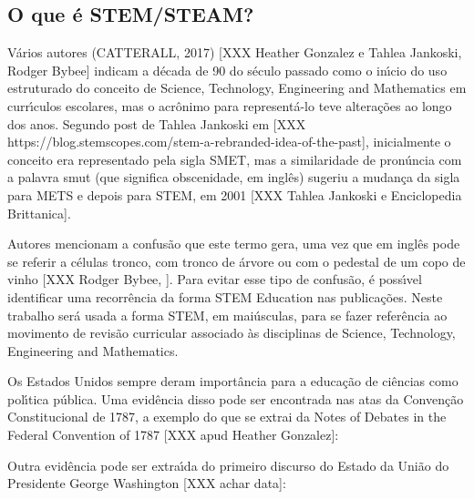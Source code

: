 \documentclass[
12pt,		%
openright,	%
twoside,  %
a4paper,			%
chapter=TITLE,		%
english,			%
french,				%
spanish,			%
brazil				%
]{USPSC-classe/USPSC}
\begin{document}
\subsection[O que \'e STEM/STEAM?]{O que \'e STEM/STEAM?}\label{O que \'e STEM/STEAM?}
V\'arios autores  (CATTERALL, 2017)  [XXX Heather Gonzalez e  Tahlea Jankoski, Rodger Bybee] indicam a d\'ecada de 90 do s\'eculo passado como o in\'{\i}cio do uso estruturado do conceito de Science, Technology, Engineering and Mathematics em curr\'{\i}culos escolares, mas o acr\^onimo para represent\'a-lo teve altera\c{c}\~oes ao longo dos anos. Segundo post de Tahlea Jankoski em [XXX https://blog.stemscopes.com/stem-a-rebranded-idea-of-the-past], inicialmente o conceito era representado pela sigla SMET, mas a similaridade de pron\'uncia com a palavra \textquotedbl smut (que significa obscenidade, em ingl\^es) sugeriu a mudan\c{c}a da sigla para METS e depois para STEM, em 2001 [XXX Tahlea Jankoski e Enciclopedia Brittanica].




Autores mencionam a confus\~ao que este termo gera, uma vez que em ingl\^es pode se referir a c\'elulas tronco, com tronco de \'arvore ou com o pedestal de um copo de vinho [XXX Rodger Bybee, ]. Para evitar esse tipo de confus\~ao, \'e poss\'{\i}vel identificar uma recorr\^encia da forma \textquotedbl STEM Education nas publica\c{c}\~oes. Neste trabalho ser\'a usada a forma STEM, em mai\'usculas, para se fazer refer\^encia ao movimento de revis\~ao curricular associado \`as disciplinas de \textquotedbl Science, Technology, Engineering and Mathematics.  




Os Estados Unidos sempre deram import\^ancia para a educa\c{c}\~ao de ci\^encias como pol\'{\i}tica p\'ublica. Uma evid\^encia disso pode ser encontrada nas atas da Conven\c{c}\~ao Constitucional de 1787, a exemplo do que se extrai da \textquotedbl Notes of Debates in the Federal Convention of 1787 [XXX apud Heather Gonzalez]:





\noindent\begin{center}\mbox{\centering{}}\end{center}


Outra evid\^encia pode ser extra\'{\i}da do primeiro discurso do Estado da Uni\~ao do Presidente George Washington [XXX achar data]:
\end{document}
